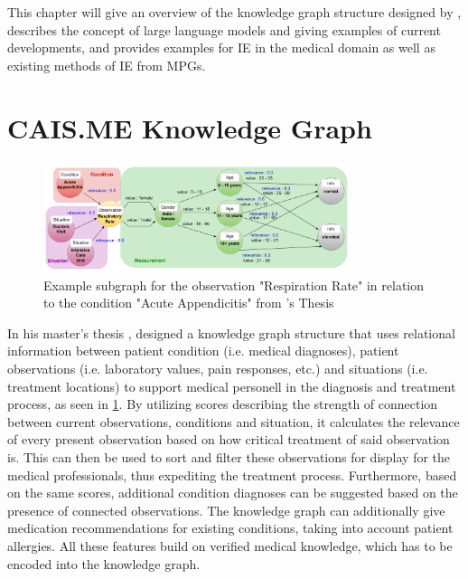 \documentclass[bs, english]{stthesis}
\edef\picturewidth{0.8\textwidth}
\begin{document}
This chapter will give an overview of the knowledge graph structure designed by \citeauthor{TOM}, describes the concept of large language models and giving examples of current developments, and provides examples for IE in the medical domain as well as existing methods of IE from MPGs.

\section{CAIS.ME Knowledge Graph}

\begin{figure}[h]
  \centering
  \includegraphics[width=\picturewidth]{graph_example.png}
  \caption{Example subgraph for the observation "Respiration Rate" in relation to the condition "Acute Appendicitis" from \citeauthor{TOM}'s Thesis\\ \cite[subsection 4.3.2]{TOM}}
  \label{fig:graphExample}
\end{figure}

In his master's thesis \cite{TOM}, \citeauthor{TOM} designed a knowledge graph structure that uses relational information between patient condition (i.e. medical diagnoses), patient observations (i.e. laboratory values, pain responses, etc.) and situations (i.e. treatment locations) to support medical personell in the diagnosis and treatment process, as seen in \cref{fig:graphExample}. By utilizing scores describing the strength of connection between current observations, conditions and situation, it calculates the relevance of every present observation based on how critical treatment of said observation is. This can then be used to sort and filter these observations for display for the medical professionals, thus expediting the treatment process. Furthermore, based on the same scores, additional condition diagnoses can be suggested based on the presence of connected observations. The knowledge graph can additionally give medication recommendations for existing conditions, taking into account patient allergies.
All these features build on verified medical knowledge, which has to be encoded into the knowledge graph.
\end{document}
